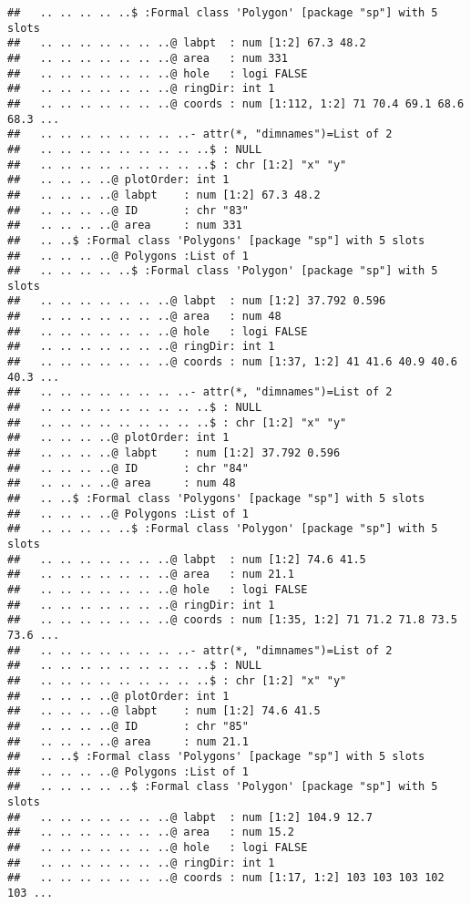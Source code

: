 \documentclass[]{article}
\begin{document}
\begin{verbatim}
##   .. .. .. .. ..$ :Formal class 'Polygon' [package "sp"] with 5 slots
##   .. .. .. .. .. .. ..@ labpt  : num [1:2] 67.3 48.2
##   .. .. .. .. .. .. ..@ area   : num 331
##   .. .. .. .. .. .. ..@ hole   : logi FALSE
##   .. .. .. .. .. .. ..@ ringDir: int 1
##   .. .. .. .. .. .. ..@ coords : num [1:112, 1:2] 71 70.4 69.1 68.6 68.3 ...
##   .. .. .. .. .. .. .. ..- attr(*, "dimnames")=List of 2
##   .. .. .. .. .. .. .. .. ..$ : NULL
##   .. .. .. .. .. .. .. .. ..$ : chr [1:2] "x" "y"
##   .. .. .. ..@ plotOrder: int 1
##   .. .. .. ..@ labpt    : num [1:2] 67.3 48.2
##   .. .. .. ..@ ID       : chr "83"
##   .. .. .. ..@ area     : num 331
##   .. ..$ :Formal class 'Polygons' [package "sp"] with 5 slots
##   .. .. .. ..@ Polygons :List of 1
##   .. .. .. .. ..$ :Formal class 'Polygon' [package "sp"] with 5 slots
##   .. .. .. .. .. .. ..@ labpt  : num [1:2] 37.792 0.596
##   .. .. .. .. .. .. ..@ area   : num 48
##   .. .. .. .. .. .. ..@ hole   : logi FALSE
##   .. .. .. .. .. .. ..@ ringDir: int 1
##   .. .. .. .. .. .. ..@ coords : num [1:37, 1:2] 41 41.6 40.9 40.6 40.3 ...
##   .. .. .. .. .. .. .. ..- attr(*, "dimnames")=List of 2
##   .. .. .. .. .. .. .. .. ..$ : NULL
##   .. .. .. .. .. .. .. .. ..$ : chr [1:2] "x" "y"
##   .. .. .. ..@ plotOrder: int 1
##   .. .. .. ..@ labpt    : num [1:2] 37.792 0.596
##   .. .. .. ..@ ID       : chr "84"
##   .. .. .. ..@ area     : num 48
##   .. ..$ :Formal class 'Polygons' [package "sp"] with 5 slots
##   .. .. .. ..@ Polygons :List of 1
##   .. .. .. .. ..$ :Formal class 'Polygon' [package "sp"] with 5 slots
##   .. .. .. .. .. .. ..@ labpt  : num [1:2] 74.6 41.5
##   .. .. .. .. .. .. ..@ area   : num 21.1
##   .. .. .. .. .. .. ..@ hole   : logi FALSE
##   .. .. .. .. .. .. ..@ ringDir: int 1
##   .. .. .. .. .. .. ..@ coords : num [1:35, 1:2] 71 71.2 71.8 73.5 73.6 ...
##   .. .. .. .. .. .. .. ..- attr(*, "dimnames")=List of 2
##   .. .. .. .. .. .. .. .. ..$ : NULL
##   .. .. .. .. .. .. .. .. ..$ : chr [1:2] "x" "y"
##   .. .. .. ..@ plotOrder: int 1
##   .. .. .. ..@ labpt    : num [1:2] 74.6 41.5
##   .. .. .. ..@ ID       : chr "85"
##   .. .. .. ..@ area     : num 21.1
##   .. ..$ :Formal class 'Polygons' [package "sp"] with 5 slots
##   .. .. .. ..@ Polygons :List of 1
##   .. .. .. .. ..$ :Formal class 'Polygon' [package "sp"] with 5 slots
##   .. .. .. .. .. .. ..@ labpt  : num [1:2] 104.9 12.7
##   .. .. .. .. .. .. ..@ area   : num 15.2
##   .. .. .. .. .. .. ..@ hole   : logi FALSE
##   .. .. .. .. .. .. ..@ ringDir: int 1
##   .. .. .. .. .. .. ..@ coords : num [1:17, 1:2] 103 103 103 102 103 ...

\end{verbatim}
\end{document}
